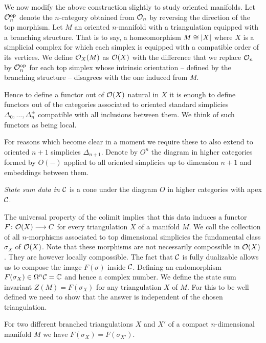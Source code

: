 We now modify the above construction slightly to study oriented manifolds.
Let $\mathcal{O}_n^{\mathrm{op}}$ denote the $n$-category obtained from $\mathcal{O}_n$ by reversing the direction of the top morphism.
Let $M$ an oriented $n$-manifold with a triangulation equipped with a branching structure.
That is to say, a homeomorphism $M \cong \lvert X\rvert$ where $X$ is a simplicial complex for which each simplex is equipped with a compatible order of its vertices.
We define $\mathcal{O}_X(M)$ as $\mathcal{O}(X)$ with the difference that we replace $\mathcal{O}_n$ by $\mathcal{O}_n^{\mathrm{op}}$ for each top simplex whose intrinsic orientation -- defined by the branching structure -- disagrees with the one induced from $M$.

Hence to define a functor out of $\mathcal{O}(X)$ natural in $X$ it is enough to define functors out of the categories associated to oriented standard simplicies $\Delta_0, \dots, \Delta_n^\pm$ compatible with all inclusions between them.
We think of such functors as being local.

For reasons which become clear in a moment we require these to also extend to oriented $n+1$ simplicies $\Delta_{n+1}$.
Denote by $O^n$ the diagram in higher categories formed by $O(-)$ applied to all oriented simplicies up to dimension $n+1$ and embeddings between them.

\begin{definition}
	\emph{State sum data in $\mathcal{C}$} is a cone under the diagram $O$ in higher categories with apex $\mathcal{C}$.
\end{definition}

The universal property of the colimit implies that this data induces a functor $F \colon \mathcal{O}(X) \longrightarrow C$ for every triangulation $X$ of a manifold $M$.
We call the collection of all $n$-morphisms associated to top dimensional simplicies the fundamental class $\sigma_X$ of $\mathcal{O}(X)$.
Note that these morphisms are not necessarily compossible in $\mathcal{O}(X)$.
They are however locally compossible.
The fact that $\mathcal{C}$ is fully dualizable
allows us to compose the image $F(\sigma)$ inside $\mathcal{C}$.
Defining an endomorphism
$F(\sigma_X)\in \Omega^n\mathcal{C}=\mathbb{C} $ and hence a complex number.
We define the state sum invariant $Z(M)=F(\sigma_X)$ for any triangulation $X$ of $M$.
For this to be well defined we need to show that the answer is independent of the chosen triangulation.

\begin{theorem}
	For two different branched triangulations $X$ and $X'$ of a compact $n$-dimensional manifold $M$ we have $F(\sigma_X)=F(\sigma_{X'})$.
\end{theorem}

